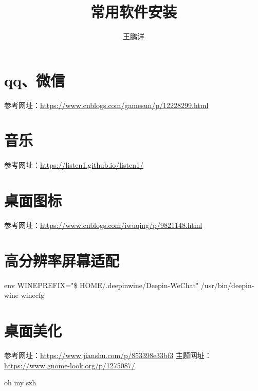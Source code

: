 \documentclass[12pt,a4paper]{article}
\title{常用软件安装}
\author{王鹏详}
\date{\chntoday}
\begin{document}
	\maketitle
	\newpage
	\section{qq、微信}
	参考网址：\url{https://www.cnblogs.com/gamesun/p/12228299.html}
	\section{音乐}
	参考网址：\url{https://listen1.github.io/listen1/}
	\section{桌面图标}
	参考网址：\url{https://www.cnblogs.com/iwuqing/p/9821148.html}
	\section{高分辨率屏幕适配}
	env WINEPREFIX="\$ HOME/.deepinwine/Deepin-WeChat" /usr/bin/deepin-wine winecfg 
 	\section{桌面美化}
 	参考网址：\url{https://www.jianshu.com/p/853398e33bf3}
 	主题网址：\url{https://www.gnome-look.org/p/1275087/}
 	
 	oh my szh
	
	
\end{document}
